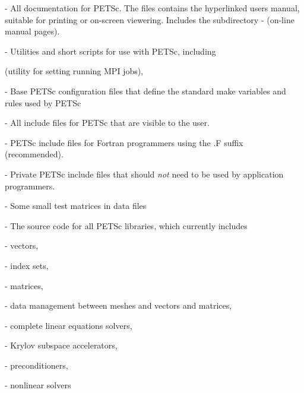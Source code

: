 {{\begin{tightitemize}
\item {} - All documentation for PETSc. The files 
                   contains the hyperlinked users manual, suitable for printing
                   or on-screen viewering. Includes the subdirectory
 \subitem -  (on-line manual pages).
\item {} - Utilities and short scripts for use with PETSc, including
 \begin{tightitemize}
 \item {} (utility for setting running MPI jobs),
 \end{tightitemize}

\item {} - Base PETSc configuration files that define the standard make variables and rules used by PETSc
\item {} - All include files for PETSc that are visible to the user.
\item {}    - PETSc include files for Fortran programmers using
                                  the .F suffix (recommended).
\item {}    - Private PETSc include files that should {\em not}
                                 need to be used by application programmers.
\item {} - Some small test matrices in data files
\item {} - The source code for all PETSc libraries, which
                  currently includes
 \begin{tightitemize}
 \item {} - vectors,
   \begin{tightitemize}
     \item {} - index sets,
   \end{tightitemize}
 \item {} - matrices,
 \item {} - data management between meshes and vectors and matrices,
 \item {} - complete linear equations solvers,
 \begin{tightitemize}
   \item {} - Krylov subspace accelerators,
   \item {} - preconditioners,
 \end{tightitemize}
 \item {} - nonlinear solvers

\end{tightitemize}
\end{tightitemize}}}
